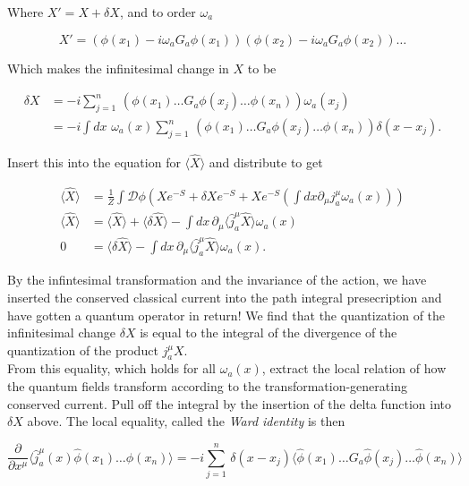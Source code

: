 \noindent Where $X' = X + \delta X$, and to order $\omega_a$

\begin{equation}
X' = (\phi (x_1) - i \omega_a G_a \phi (x_1)) (\phi (x_2) - i \omega_a G_a \phi (x_2)) \dots
\end{equation}

\noindent Which makes the infinitesimal change in $X$ to be

\begin{align}
\delta X &= -i \sum_{j=1}^n \, \left(\phi(x_1) \dots G_a \phi(x_j) \dots \phi(x_n) \right) \omega_a (x_j) \\
&= -i \int dx \,\, \omega_a (x) \sum_{j=1}^n  \, \left(\phi(x_1) \dots G_a \phi(x_j) \dots \phi(x_n) \right) \delta (x-x_j).
\end{align}

\noindent Insert this into the equation for $\langle \hat{X} \rangle$ and distribute to get

\begin{align}
\langle \hat{X} \rangle &= \frac{1}{Z} \int \mathcal{D} \phi \left( X e^{-S} + \delta X e^{-S} + X e^{-S}\left(\int dx \partial_\mu j_a^\mu \omega_a (x)\right) \right) \\
\langle \hat{X} \rangle &= \langle \hat{X} \rangle + \langle \delta \hat{X} \rangle - \int dx \, \partial_\mu \langle \hat{j}_a^\mu \hat{X} \rangle \omega_a (x) \\
0 &= \langle \delta \hat{X} \rangle - \int dx \, \partial_\mu \langle \hat{j}_a^\mu \hat{X} \rangle \omega_a (x).
\end{align}

\noindent By the infintesimal transformation and the invariance of the action, we have inserted the conserved classical current into the path integral presecription and have gotten a quantum operator in return! We find that the quantization of the infinitesimal change $\delta X$ is equal to the integral of the divergence of the quantization of the product $j_a^\mu X$. \\

\noindent From this equality, which holds for all $\omega_a (x)$, extract the local relation of how the quantum fields transform according to the transformation-generating conserved current. Pull off the integral by the insertion of the delta function into $\delta X$ above. The local equality, called the \textit{Ward identity} is then

\begin{equation}
\frac{\partial}{\partial x^\mu} \langle \hat{j}_a^\mu (x) \hat{\phi} (x_1) \dots \hat{\phi} (x_n) \rangle = -i \sum_{j=1}^n \, \delta (x-x_j) \langle\hat{\phi} (x_1) \dots G_a \hat{\phi} (x_j) \dots \hat{\phi} (x_n) \rangle
\end{equation}

